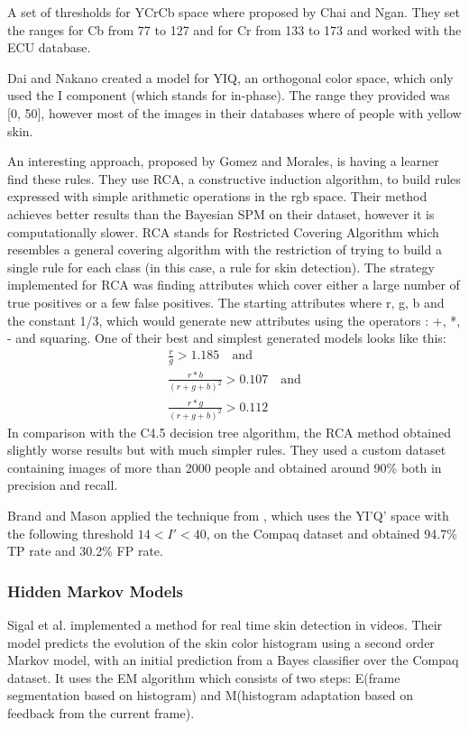 \documentclass[12pt]{report}
\begin{document}
 	A set of thresholds for YCrCb space where proposed by Chai and Ngan\cite{cr_cb_threshold}. They set the ranges for Cb from 77 to 127 and for Cr from 133 to 173 and worked with the ECU database.
 	
 	Dai and Nakano\cite{yiq_threshold} created a model for YIQ, an orthogonal color space, which only used the I component (which stands for in-phase). The range they provided was [0, 50], however most of the images in their databases where of people with yellow skin.
 	
 	An interesting approach, proposed by Gomez and Morales\cite{rca_threshold}, is having a learner find these rules. They use RCA, a constructive induction algorithm, to build rules expressed with simple arithmetic operations in the rgb space. Their method achieves better results than the Bayesian SPM on their dataset, however it is computationally slower. RCA stands for Restricted Covering Algorithm which resembles a general covering algorithm with the restriction of trying to build a single rule for each class (in this case, a rule for skin detection). The strategy implemented for RCA was finding attributes which cover either a large number of true positives or a few false positives. The starting attributes where r, g, b and the constant 1/3, which would generate new attributes using the operators : +, *, - and squaring. One of their best and simplest generated models looks like this:
 	\begin{equation}
 	\begin{split}
 	\frac{r}{g} > 1.185 \quad \textrm{and}\\
 	\frac{r * b}{(r + g + b)^2} > 0.107 \quad \textrm{and}\\
 	\frac{r * g}{(r + g + b)^2} > 0.112
 	\end{split}
 	\end{equation}
 	In comparison with the C4.5 decision tree algorithm, the RCA method obtained slightly worse results but with much simpler rules. They used a custom dataset containing images of more than 2000 people and obtained around 90\% both in precision and recall.
 	
 	Brand and Mason \cite{i_threshold_applied} applied the technique from \cite{i_threshold}, which uses the YI'Q' space with the following threshold \(14 < I' < 40\), on the Compaq dataset and obtained 94.7\% TP rate and 30.2\% FP rate.
 	
 	\subsubsection{Hidden Markov Models}
 	Sigal et al.\cite{hmm} implemented a method for real time skin detection in videos. Their model predicts the evolution of the skin color histogram using a second order Markov model, with an initial prediction from a Bayes classifier over the Compaq dataset. It uses the EM algorithm which consists of two steps: E(frame segmentation based on histogram) and M(histogram adaptation based on feedback from the current frame).
 	
\end{document}
